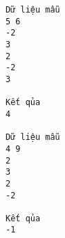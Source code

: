 \begin{verbatim}
Dữ liệu mẫu
5 6
-2
3
2
-2
3

Kết qủa
4

Dữ liệu mẫu
4 9
2
3
2
-2

Kết qủa
-1
\end{verbatim}